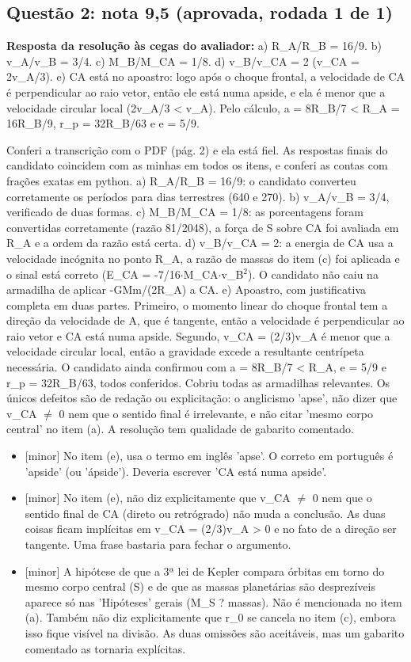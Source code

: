\documentclass{article}%
\begin{document}
\subsection*{Questão 2: nota 9,5 (aprovada, rodada 1 de 1)}%
\textbf{Resposta da resolução às cegas do avaliador:} a) R\_A/R\_B = 16/9. b) v\_A/v\_B = 3/4. c) M\_B/M\_CA = 1/8. d) v\_B/v\_CA = 2 (v\_CA = 2v\_A/3). e) CA está no apoastro: logo após o choque frontal, a velocidade de CA é perpendicular ao raio vetor, então ele está numa apside, e ela é menor que a velocidade circular local (2v\_A/3 < v\_A). Pelo cálculo, a = 8R\_B/7 < R\_A = 16R\_B/9, r\_p = 32R\_B/63 e e = 5/9.\par %
Conferi a transcrição com o PDF (pág. 2) e ela está fiel. As respostas finais do candidato coincidem com as minhas em todos os itens, e conferi as contas com frações exatas em python. a) R\_A/R\_B = 16/9: o candidato converteu corretamente os períodos para dias terrestres (640 e 270). b) v\_A/v\_B = 3/4, verificado de duas formas. c) M\_B/M\_CA = 1/8: as porcentagens foram convertidas corretamente (razão 81/2048), a força de S sobre CA foi avaliada em R\_A e a ordem da razão está certa. d) v\_B/v\_CA = 2: a energia de CA usa a velocidade incógnita no ponto R\_A, a razão de massas do item (c) foi aplicada e o sinal está correto (E\_CA = -7/16$\cdot$M\_CA$\cdot$v\_B$^2$). O candidato não caiu na armadilha de aplicar -GMm/(2R\_A) a CA. e) Apoastro, com justificativa completa em duas partes. Primeiro, o momento linear do choque frontal tem a direção da velocidade de A, que é tangente, então a velocidade é perpendicular ao raio vetor e CA está numa apside. Segundo, v\_CA = (2/3)v\_A é menor que a velocidade circular local, então a gravidade excede a resultante centrípeta necessária. O candidato ainda confirmou com a = 8R\_B/7 < R\_A, e = 5/9 e r\_p = 32R\_B/63, todos conferidos. Cobriu todas as armadilhas relevantes. Os únicos defeitos são de redação ou explicitação: o anglicismo 'apse', não dizer que v\_CA $\neq$ 0 nem que o sentido final é irrelevante, e não citar 'mesmo corpo central' no item (a). A resolução tem qualidade de gabarito comentado.%
\begin{itemize}%
\item%
{[}minor{]} No item (e), usa o termo em inglês 'apse'. O correto em português é 'apside' (ou 'ápside'). Deveria escrever 'CA está numa apside'.%
\item%
{[}minor{]} No item (e), não diz explicitamente que v\_CA $\neq$ 0 nem que o sentido final de CA (direto ou retrógrado) não muda a conclusão. As duas coisas ficam implícitas em v\_CA = (2/3)v\_A > 0 e no fato de a direção ser tangente. Uma frase bastaria para fechar o argumento.%
\item%
{[}minor{]} A hipótese de que a 3ª lei de Kepler compara órbitas em torno do mesmo corpo central (S) e de que as massas planetárias são desprezíveis aparece só nas 'Hipóteses' gerais (M\_S ? massas). Não é mencionada no item (a). Também não diz explicitamente que r\_0 se cancela no item (c), embora isso fique visível na divisão. As duas omissões são aceitáveis, mas um gabarito comentado as tornaria explícitas.%
\end{itemize}%
\end{document}
